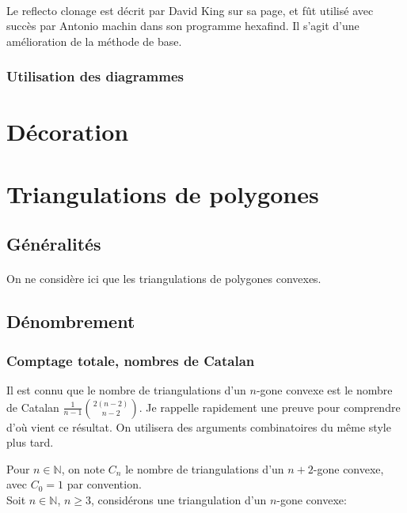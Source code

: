 \documentclass[10pt,a4paper]{article}
\begin{document}
			\paragraph{}Le reflecto clonage est décrit par David King sur sa page, et fût utilisé avec succès par Antonio machin dans son programme hexafind. Il s'agit d'une amélioration de la méthode de base.
			
		\subsubsection{Utilisation des diagrammes}
		
		
	\section{Décoration}
	
	
	
\section{Triangulations de polygones}


	\subsection{Généralités}
		\paragraph{}On ne considère ici que les triangulations de polygones convexes.
		
		
	\subsection{Dénombrement}
	
		\subsubsection{Comptage totale, nombres de Catalan}
			Il est connu que le nombre de triangulations d'un $n$-gone convexe est le nombre de Catalan 
			$\frac{1}{n-1}\binom{2(n-2)}{n-2}$. Je rappelle rapidement une preuve pour comprendre d'où vient ce résultat. On utilisera des arguments combinatoires du même style plus tard.

			Pour $n\in\mathbb{N}$, on note $C_{n}$ le nombre de triangulations d'un $n+2$-gone convexe, avec $C_{0} = 1$ par convention.\\			
			Soit $n \in \mathbb{N}$, $n \geqslant3$, considérons une triangulation  d'un $n$-gone convexe:\\
\end{document}
